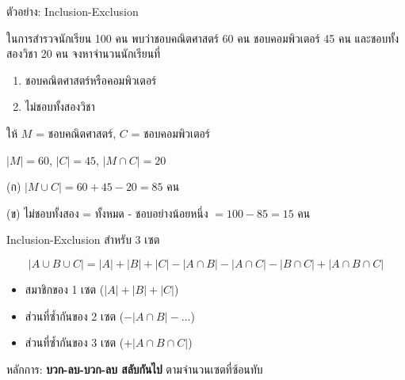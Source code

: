 \documentclass[11pt, aspectratio=169]{beamer}
\begin{document}
\begin{frame}{ตัวอย่าง: Inclusion-Exclusion}
  \begin{exambox}[โจทย์]
    ในการสำรวจนักเรียน 100 คน พบว่าชอบคณิตศาสตร์ 60 คน
    ชอบคอมพิวเตอร์ 45 คน และชอบทั้งสองวิชา 20 คน
    จงหาจำนวนนักเรียนที่
    \begin{enumerate}
      \item[(ก)] ชอบคณิตศาสตร์หรือคอมพิวเตอร์
      \item[(ข)] ไม่ชอบทั้งสองวิชา
    \end{enumerate}
  \end{exambox}

  \begin{solbox}[วิธีทำ]
    ให้ $M$ = ชอบคณิตศาสตร์, $C$ = ชอบคอมพิวเตอร์

    $|M| = 60$, $|C| = 45$, $|M \cap C| = 20$

    (ก) $|M \cup C| = 60 + 45 - 20 = 85$ คน

    (ข) ไม่ชอบทั้งสอง = ทั้งหมด - ชอบอย่างน้อยหนึ่ง
    $= 100 - 85 = 15$ คน
  \end{solbox}
\end{frame}

\begin{frame}{Inclusion-Exclusion สำหรับ 3 เซต}
  \begin{explanation}
    \[
      |A \cup B \cup C| = |A| + |B| + |C|
      - |A \cap B| - |A \cap C| - |B \cap C|
      + |A \cap B \cap C|
    \]
  \end{explanation}

  \begin{intuition}[หลักการ]
    \begin{itemize}
      \item {} สมาชิกของ 1 เซต ($|A|+|B|+|C|$)
      \item {} ส่วนที่ซํ้ากันของ 2 เซต ($-|A \cap B| - \ldots$)
      \item {} ส่วนที่ซํ้ากันของ 3 เซต ($+|A \cap B \cap C|$)
    \end{itemize}
    หลักการ: \textbf{บวก-ลบ-บวก-ลบ สลับกันไป} ตามจำนวนเซตที่ซ้อนทับ
  \end{intuition}
\end{frame}
\end{document}
